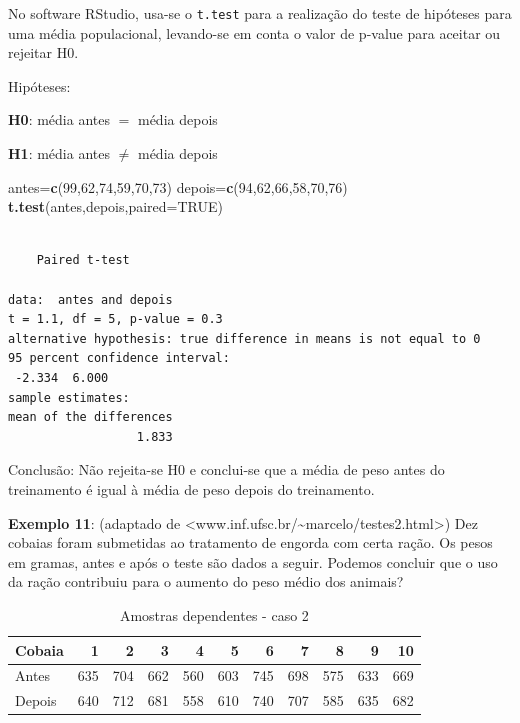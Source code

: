\documentclass[12pt,portuguese,oneside]{book}
\newenvironment{Shaded}{\begin{snugshade}}{\end{snugshade}}
\newcommand{\KeywordTok}[1]{\textcolor[rgb]{0.13,0.29,0.53}{\textbf{#1}}}
\newcommand{\DataTypeTok}[1]{\textcolor[rgb]{0.13,0.29,0.53}{#1}}
\newcommand{\DecValTok}[1]{\textcolor[rgb]{0.00,0.00,0.81}{#1}}
\newcommand{\OtherTok}[1]{\textcolor[rgb]{0.56,0.35,0.01}{#1}}
\newcommand{\NormalTok}[1]{#1}
\begin{document}
No software RStudio, usa-se o \texttt{t.test} para a realização do teste
de hipóteses para uma média populacional, levando-se em conta o valor de
p-value para aceitar ou rejeitar H0.

Hipóteses:

\textbf{H0}: média antes \(=\) média depois

\textbf{H1}: média antes \(\neq\) média depois

\begin{Shaded}
\begin{Highlighting}[]
\NormalTok{antes=}\KeywordTok{c}\NormalTok{(}\DecValTok{99}\NormalTok{,}\DecValTok{62}\NormalTok{,}\DecValTok{74}\NormalTok{,}\DecValTok{59}\NormalTok{,}\DecValTok{70}\NormalTok{,}\DecValTok{73}\NormalTok{)}
\NormalTok{depois=}\KeywordTok{c}\NormalTok{(}\DecValTok{94}\NormalTok{,}\DecValTok{62}\NormalTok{,}\DecValTok{66}\NormalTok{,}\DecValTok{58}\NormalTok{,}\DecValTok{70}\NormalTok{,}\DecValTok{76}\NormalTok{)}
\KeywordTok{t.test}\NormalTok{(antes,depois,}\DataTypeTok{paired=}\OtherTok{TRUE}\NormalTok{)}
\end{Highlighting}
\end{Shaded}

\begin{verbatim}

    Paired t-test

data:  antes and depois
t = 1.1, df = 5, p-value = 0.3
alternative hypothesis: true difference in means is not equal to 0
95 percent confidence interval:
 -2.334  6.000
sample estimates:
mean of the differences 
                  1.833 
\end{verbatim}

Conclusão: Não rejeita-se H0 e conclui-se que a média de peso antes do
treinamento é igual à média de peso depois do treinamento.

\textbf{Exemplo 11}: (adaptado de
\textless{}www.inf.ufsc.br/\textasciitilde{}marcelo/testes2.html\textgreater{})
Dez cobaias foram submetidas ao tratamento de engorda com certa ração.
Os pesos em gramas, antes e após o teste são dados a seguir. Podemos
concluir que o uso da ração contribuiu para o aumento do peso médio dos
animais?

\begin{table}

\caption{\label{tab:unnamed-chunk-111}Amostras dependentes - caso 2}
\centering
\begin{tabular}[t]{l|r|r|r|r|r|r|r|r|r|r}
\hline
Cobaia & 1 & 2 & 3 & 4 & 5 & 6 & 7 & 8 & 9 & 10\\
\hline
Antes & 635 & 704 & 662 & 560 & 603 & 745 & 698 & 575 & 633 & 669\\
\hline
Depois & 640 & 712 & 681 & 558 & 610 & 740 & 707 & 585 & 635 & 682\\
\hline
\end{tabular}
\end{table}
\end{document}
